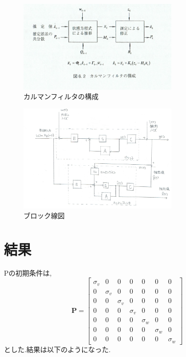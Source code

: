 \documentclass[dvipdfmx, fleqn, uplatex, a4paper]{jsarticle}
\begin{document}
\begin{enumerate}
  \begin{figure}[H]
    \begin{center}
    \includegraphics[width=8cm]{../images/kalman_system.png}
    \caption{カルマンフィルタの構成}
    \label{kalman_system}
  \end{center}
  \end{figure}

  \begin{figure}[H]
    \begin{center}
    \includegraphics[width=8cm]{../images/kalman_block.png}
    \caption{ブロック線図}
    \label{kalman_block}
  \end{center}
  \end{figure}

\end{enumerate}

\section{結果}
Pの初期条件は,
\begin{equation}
  \bm{P} = \begin{bmatrix}
  \sigma_v & 0 & 0 & 0 & 0 & 0 & 0 \\
  0 & \sigma_v & 0 & 0 & 0 & 0 & 0 \\
  0 & 0 & \sigma_v & 0 & 0 & 0 & 0 \\
  0 & 0 & 0 & \sigma_v & 0 & 0 & 0 \\
  0 & 0 & 0 & 0 & \sigma_w & 0 & 0 \\
  0 & 0 & 0 & 0 & 0 & \sigma_w & 0 \\
  0 & 0 & 0 & 0 & 0 & 0 & \sigma_w
\end{bmatrix}
\end{equation}
とした.結果は以下のようになった.
\end{document}
